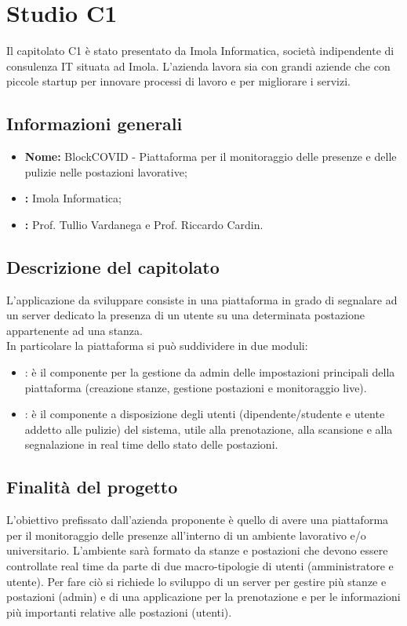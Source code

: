 \section{Studio C1}
Il capitolato C1 è stato presentato da Imola Informatica, società indipendente di consulenza IT situata ad Imola. L'azienda lavora sia con grandi aziende che con piccole startup per innovare processi di lavoro e per migliorare i servizi.\\

\subsection{Informazioni generali}
\begin{itemize}
	\item \textbf{Nome:} BlockCOVID - Piattaforma per il monitoraggio delle presenze e delle pulizie nelle postazioni lavorative;
	\item \textbf{:} Imola Informatica;
	\item \textbf{:} Prof. Tullio Vardanega e Prof. Riccardo Cardin.
\end{itemize}

\subsection{Descrizione del capitolato}
L'applicazione da sviluppare consiste in una piattaforma in grado di segnalare ad un server dedicato la presenza di un utente su una determinata postazione appartenente ad una stanza. \\
In particolare la piattaforma si può suddividere in due moduli:
\begin{itemize}
	\item {}: è il componente per la gestione da admin delle impostazioni principali della piattaforma (creazione stanze, gestione postazioni e monitoraggio live).
	\item {}: è il componente a disposizione degli utenti (dipendente/studente e utente addetto alle pulizie) del sistema, utile alla prenotazione, alla scansione e alla segnalazione in real time dello stato delle postazioni.
\end{itemize}

\subsection{Finalità del progetto}
L'obiettivo prefissato dall'azienda proponente è quello di avere una piattaforma per il monitoraggio delle presenze all'interno di un ambiente lavorativo e/o universitario. L'ambiente sarà formato da stanze e postazioni che devono essere controllate real time da parte di due macro-tipologie di utenti (amministratore e utente). Per fare ciò si richiede lo sviluppo di un server per gestire più stanze e postazioni (admin) e di una applicazione per la prenotazione e per le informazioni più importanti relative alle postazioni (utenti).

